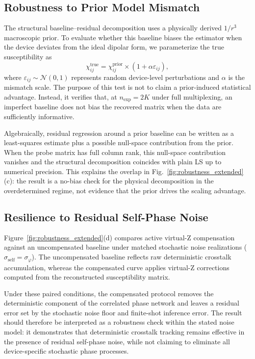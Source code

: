 \documentclass[a4paper,twocolumn,11pt]{quantumarticle}
\begin{document}
\subsection{Robustness to Prior Model Mismatch}
\label{app:robustness_prior}
The structural baseline--residual decomposition uses a physically derived $1/r^3$ macroscopic prior. To evaluate whether this baseline biases the estimator when the device deviates from the ideal dipolar form, we parameterize the true susceptibility as
\begin{equation}
    \chi_{ij}^{\text{true}} = \chi_{ij}^{\text{prior}} \times (1 + \alpha \varepsilon_{ij}),
    \label{eq:prior_mismatch_model}
\end{equation}
where $\varepsilon_{ij}\sim\mathcal{N}(0,1)$ represents random device-level perturbations and $\alpha$ is the mismatch scale. The purpose of this test is not to claim a prior-induced statistical advantage. Instead, it verifies that, at $n_{\text{exp}}=2K$ under full multiplexing, an imperfect baseline does not bias the recovered matrix when the data are sufficiently informative.

Algebraically, residual regression around a prior baseline can be written as a least-squares estimate plus a possible null-space contribution from the prior. When the probe matrix has full column rank, this null-space contribution vanishes and the structural decomposition coincides with plain LS up to numerical precision. This explains the overlap in Fig.~\ref{fig:robustness_extended}(c): the result is a no-bias check for the physical decomposition in the overdetermined regime, not evidence that the prior drives the scaling advantage.

\subsection{Resilience to Residual Self-Phase Noise}
\label{app:self_phase_noise}

Figure~\ref{fig:robustness_extended}(d) compares active virtual-Z compensation against an uncompensated baseline under matched stochastic noise realizations ($\sigma_{\text{self}}=\sigma_\varphi$). The uncompensated baseline reflects raw deterministic crosstalk accumulation, whereas the compensated curve applies virtual-Z corrections computed from the reconstructed susceptibility matrix.

Under these paired conditions, the compensated protocol removes the deterministic component of the correlated phase network and leaves a residual error set by the stochastic noise floor and finite-shot inference error. The result should therefore be interpreted as a robustness check within the stated noise model: it demonstrates that deterministic crosstalk tracking remains effective in the presence of residual self-phase noise, while not claiming to eliminate all device-specific stochastic phase processes.
\end{document}
